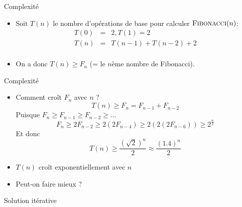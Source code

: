 \begin{frame}{Complexité}
\begin{center}
\end{center}

\bigskip

\begin{itemize}
\item Soit $T(n)$ le nombre d'opérations de base pour calculer $\textnormal{\scshape Fibonacci}(n)$:
\begin{eqnarray*}
T(0) & = & 2, T(1)=2\\
T(n) & = & T(n-1)+T(n-2)+2\\
\end{eqnarray*}
\item On a donc $T(n)\geq F_n$ (= le $n$ème nombre de Fibonacci).
\end{itemize}

\end{frame}

\begin{frame}{Complexité}

\begin{itemize}
\item Comment croît $F_n$ avec $n$ ?
$$T(n)\geq F_n=F_{n-1}+F_{n-2}$$
Puisque $F_n\geq F_{n-1}\geq F_{n-2}\geq\ldots$
$$F_n\geq 2 F_{n-2}\geq 2(2 F_{n-4})\geq 2(2(2 F_{n-6})) \geq 2^{\frac{n}{2}}$$
Et donc
$$T(n)\geq \frac{(\sqrt{2})^n}{2} \approx \frac{(1.4)^n}{2}$$
\item $T(n)$ croît \alert{exponentiellement} avec $n$

\bigskip

\item Peut-on faire mieux ?
\end{itemize}
\end{frame}

\begin{frame}{Solution itérative}

\begin{center}
\end{center}


\end{frame}

